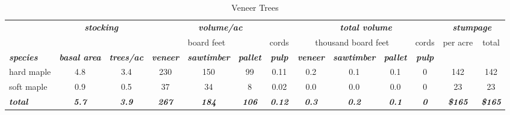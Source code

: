 \documentclass[landscape]{article}
\begin{document}
\begin{table}[H]

\caption{\label{tab:unnamed-chunk-46}Veneer Trees}
\fontsize{10}{12}\selectfont
\begin{tabular}[t]{lcccccccccccc}
\toprule
\multicolumn{1}{c}{\em{\textbf{ }}} & \multicolumn{2}{c}{\em{\textbf{stocking}}} & \multicolumn{4}{c}{\em{\textbf{volume/ac }}} & \multicolumn{4}{c}{\em{\textbf{total volume}}} & \multicolumn{2}{c}{\em{\textbf{stumpage}}} \\
\cmidrule(l{3pt}r{3pt}){2-3} \cmidrule(l{3pt}r{3pt}){4-7} \cmidrule(l{3pt}r{3pt}){8-11} \cmidrule(l{3pt}r{3pt}){12-13}
\multicolumn{3}{c}{ } & \multicolumn{3}{c}{board feet} & \multicolumn{1}{c}{cords} & \multicolumn{3}{c}{thousand board feet} & \multicolumn{1}{c}{cords} & \multicolumn{1}{c}{per acre} & \multicolumn{1}{c}{total} \\
\cmidrule(l{3pt}r{3pt}){4-6} \cmidrule(l{3pt}r{3pt}){7-7} \cmidrule(l{3pt}r{3pt}){8-10} \cmidrule(l{3pt}r{3pt}){11-11} \cmidrule(l{3pt}r{3pt}){12-12} \cmidrule(l{3pt}r{3pt}){13-13}
\rowcolor[HTML]{DCDCDC}  \em{\textbf{species}} & \em{\textbf{basal area}} & \em{\textbf{trees/ac}} & \em{\textbf{veneer}} & \em{\textbf{sawtimber}} & \em{\textbf{pallet}} & \em{\textbf{pulp}} & \em{\textbf{veneer}} & \em{\textbf{sawtimber}} & \em{\textbf{pallet}} & \em{\textbf{pulp}} & \em{\textbf{ }} & \em{\textbf{ }}\\
\midrule
\rowcolor{gray!6}  hard maple & 4.8 & 3.4 & 230 & 150 & 99 & 0.11 & 0.2 & 0.1 & 0.1 & 0 & 142 & 142\\
 
soft maple & 0.9 & 0.5 & 37 & 34 & 8 & 0.02 & 0.0 & 0.0 & 0.0 & 0 & 23 & 23\\
 
\rowcolor{gray!6}  \rowcolor[HTML]{DCDCDC}  \em{\textbf{total}} & \em{\textbf{5.7}} & \em{\textbf{3.9}} & \em{\textbf{267}} & \em{\textbf{184}} & \em{\textbf{106}} & \em{\textbf{0.12}} & \em{\textbf{0.3}} & \em{\textbf{0.2}} & \em{\textbf{0.1}} & \em{\textbf{0}} & \em{\textbf{\$165}} & \em{\textbf{\$165}}\\
\bottomrule
\end{tabular}
\end{table}
\end{document}

